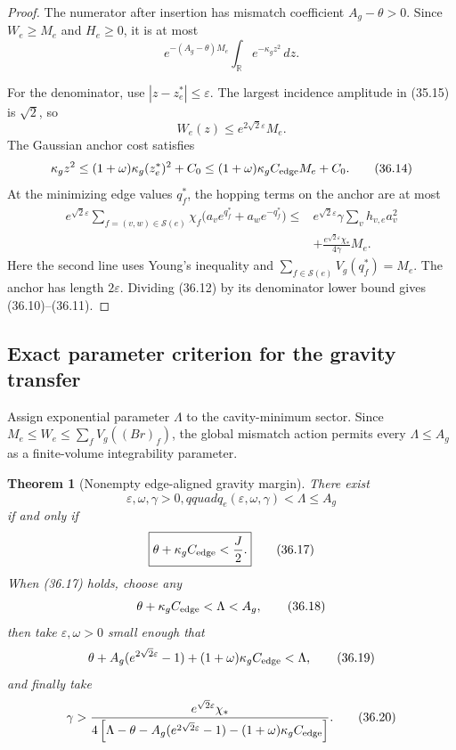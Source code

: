\documentclass[11pt]{article}
\newtheorem{theorem}{Theorem}[section]
\theoremstyle{remark}
\begin{document}
\begin{proof}
The numerator after insertion has mismatch coefficient
\(A_g-\theta>0\).  Since \(W_e\geq M_e\) and \(H_e\geq0\), it is at
most
\[
 e^{-(A_g-\theta)M_e}
 \int_{\mathbb R}e^{-\kappa_gz^2}\,dz.             \tag{36.12}
\]

For the denominator, use
\(|z-z_e^*|\leq\varepsilon\).  The largest incidence amplitude in
(35.15) is \(\sqrt2\), so
\[
 W_e(z)\leq e^{2\sqrt2\varepsilon}M_e.             \tag{36.13}
\]
The Gaussian anchor cost satisfies
\[
 \kappa_gz^2
 \leq(1+\omega)\kappa_g(z_e^*)^2+C_0
 \leq(1+\omega)\kappa_gC_{\rm edge}M_e+C_0.       \tag{36.14}
\]
At the minimizing edge values \(q_f^*\), the hopping terms on the
anchor are at most
\[
\begin{aligned}
 e^{\sqrt2\varepsilon}
 \sum_{f=(v,w)\in\mathcal S(e)}\chi_f
 \bigl(a_ve^{q_f^*}+a_we^{-q_f^*}\bigr)
 \leq{}&e^{\sqrt2\varepsilon}\gamma
 \sum_vh_{v,e}a_v^2\\
 &+\frac{e^{\sqrt2\varepsilon}\chi_*}{4\gamma}M_e.
                                                               \tag{36.15}
\end{aligned}
\]
Here the second line uses Young's inequality and
\(\sum_{f\in\mathcal S(e)}V_g(q_f^*)=M_e\).  The anchor has length
\(2\varepsilon\).  Dividing (36.12) by its denominator lower bound
gives (36.10)--(36.11).
\end{proof}

\subsection{Exact parameter criterion for the gravity transfer}

Assign exponential parameter \(\Lambda\) to the cavity-minimum sector.
Since \(M_e\leq W_e\leq\sum_fV_g((Br)_f)\), the global mismatch action
permits every \(\Lambda\leq A_g\) as a finite-volume integrability
parameter.

\begin{theorem}[Nonempty edge-aligned gravity margin]
\label{thm:v17v36-margin}
There exist
\[
 \varepsilon,\omega,\gamma>0,qquad
 q_e(\varepsilon,\omega,\gamma)<\Lambda\leq A_g  \tag{36.16}
\]
if and only if
\[
\boxed{
 \theta+\kappa_gC_{\rm edge}<\frac J2.}            \tag{36.17}
\]
When (36.17) holds, choose any
\[
 \theta+\kappa_gC_{\rm edge}<\Lambda<A_g,         \tag{36.18}
\]
then take \(\varepsilon,\omega>0\) small enough that
\[
 \theta+A_g(e^{2\sqrt2\varepsilon}-1)
 +(1+\omega)\kappa_gC_{\rm edge}<\Lambda,         \tag{36.19}
\]
and finally take
\[
 \gamma>
 \frac{e^{\sqrt2\varepsilon}\chi_*}
 {4\left[
 \Lambda-\theta-A_g(e^{2\sqrt2\varepsilon}-1)
 -(1+\omega)\kappa_gC_{\rm edge}
 \right]}.                                        \tag{36.20}
\]
\end{theorem}
\end{document}
